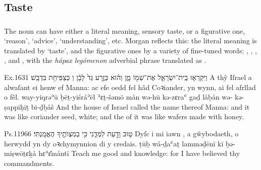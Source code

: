 \subsection{Taste}

\subsubsection{}


\begin{paper}
	The noun  can have either a literal meaning, sensory taste, or a figurative one, ‘reason’, ‘advice’, ‘understanding’, etc. Morgan reflects this: the literal meaning is translated by  ‘taste’, and the figurative ones by a variety of fine-tuned words: , , , ,  and , with the \textit{hápax legómenon} adverbial phrase  translated as .
\end{paper}

\begin{example}{Ex.}{16}{31}{}{}
	\quoling
	{וַיִּקְרְא֧וּ בֵֽית־יִשְׂרָאֵ֛ל אֶת־שְׁמ֖וֹ מָ֑ן וְה֗וּא כְּזֶ֤רַע גַּד֙ לָבָ֔ן וְ כְּצַפִּיחִ֥ת בִּדְבָֽשׁ׃}
	{A thŷ Iſrael a alwaſant ei henw ef Manna: ac efe oedd fel hâd Coꝛiander, yn wynn, ai  fel afrllad o fêl.}
	{way-yiqrəʾū ḇēṯ-yiśråʾēl ʾɛṯ-šəmō mån wə-hū kə-zɛraʿ gaḏ låḇån wə- kə-ṣappīḥīṯ bi-ḏḇåš}
	{And the house of Israel called the name thereof Manna: and it was like coriander seed, white; and the  of it was like wafers made with honey.}
\end{example}

\begin{example}{Ps.}{119}{66}{}{}
	\quoling
	{ט֤וּב  וָדַ֣עַת לַמְּדֵ֑נִי כִּ֖י בְמִצְוֺתֶ֣יךָ הֶאֱמָֽנְתִּי׃}
	{Dyſc i mi iawn , a gŵybodaeth, o herwydd yn dy oꝛchymynnion di y credais.}
	{ṭūḇ  wå-ḏaʿaṯ lamməḏēnī kī ḇə-miṣwōṯɛḵå hɛʾɛ̆måntī}
	{Teach me good  and knowledge: for I have believed thy commandments.}
\end{example}


